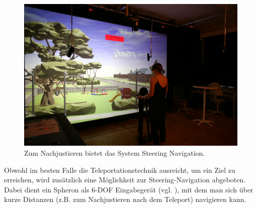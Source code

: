 \begin{figure}[h!]
  \centering
  \includegraphics[width=\textwidth]{images/steering.jpg}
  \caption{Zum Nachjustieren bietet das System Steering Navigation.}
  \label{fig:todo}
\end{figure}


Obwohl im besten Falle die Teleportationstechnik ausreicht, um ein Ziel zu erreichen, wird zusätzlich eine Möglichkeit zur Steering-Navigation abgeboten. Dabei dient ein Spheron als 6-DOF Eingabegerät (vgl. \cite{Kulik2011C1x6}), mit dem man sich über kurze Distanzen (z.B. zum Nachjustieren nach dem Teleport) navigieren kann.

